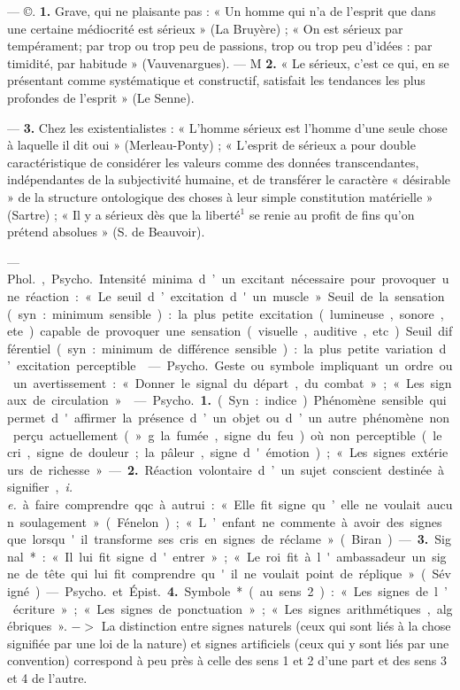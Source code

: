 \begin{itemize}[leftmargin=1cm, label=, itemsep=1pt]
 — ©. {\bf 1.} Grave, qui ne plaisante pas : « Un homme qui n’a de
l'esprit que dans une certaine médiocrité est sérieux » (La Bruyère) ;
« On est sérieux par tempérament;
par trop ou trop peu de passions,
trop ou trop peu d'idées : par timidité, par habitude » (Vauvenargues).
— M {\bf 2.} « Le sérieux, c’est ce qui, en
se présentant comme systématique
et constructif, satisfait les tendances
les plus profondes de l'esprit » (Le
Senne).

— {\bf 3.} Chez les existentialistes :
« L'homme sérieux est l’homme d’une
seule chose à laquelle il dit oui » (Merleau-Ponty) ; « L'esprit de sérieux a
pour double caractéristique de considérer les valeurs comme des données
transcendantes, indépendantes de
la subjectivité humaine, et de transférer le caractère « désirable » de la
structure ontologique des choses à
leur simple constitution matérielle »
(Sartre) ; « Il y a sérieux dès que la
liberté$^1$ se renie au profit de fins
qu'on prétend absolues » (S. de
Beauvoir).

 — \si{Phol.}, \si{Psycho.} Intensité minima d’un excitant nécessaire pour
provoquer une réaction : « Le seuil
d’excitation d'un muscle ». Seuil de
la sensation (syn. : minimum sensible) : la plus petite excitation
(lumineuse, sonore, ete.) capable de
provoquer une sensation (visuelle,
auditive, etc). Seuil différentiel
(syn. : minimum de différence sensible) :
la plus petite variation d’excitation perceptible.

 — \si{Psycho.} Geste ou symbole
impliquant un ordre ou un avertissement : « Donner le signal du départ,
du combat »; « Les signaux de circulation ».

 — \si{Psycho.} {\bf 1.} (Syn. : indice).
Phénomène sensible qui permet
d'affirmer la présence d’un objet
ou d’un autre phénomène non perçu
actuellement (»g. la fumée, signe
du feu) où non perceptible (le cri,
signe de douleur; la pâleur, signe
d'émotion) ; « Les signes extérieurs
de richesse ». — {\bf 2.} Réaction volontaire d’un sujet conscient destinée à
signifier, {\it i. e.} à faire comprendre
qqc. à autrui : « Elle fit signe qu’elle
ne voulait aucun soulagement »
(Fénelon) ; « L’enfant ne commente
à avoir des signes que lorsqu'il
transforme ses cris en signes de
réclame » (Biran). — {\bf 3.} Signal* :
« Il lui fit signe d'entrer »; « Le roi
fit à l'ambassadeur un signe de tête
qui lui fit comprendre qu'il ne voulait point de réplique » (Sévigné). —
\si{Psycho.} et \si{Épist.} {\bf 4.} Symbole* (au
sens 2) : « Les signes de l’écriture »;
« Les signes de ponctuation »; « Les
signes arithmétiques, algébriques ».
$->$ La distinction entre signes
naturels (ceux qui sont liés à la chose
signifiée par une loi de la nature) et
signes artificiels (ceux qui y sont
liés par une convention) correspond
à peu près à celle des sens 1 et 2
d’une part et des sens 3 et 4 de
l'autre.


\end{itemize}
